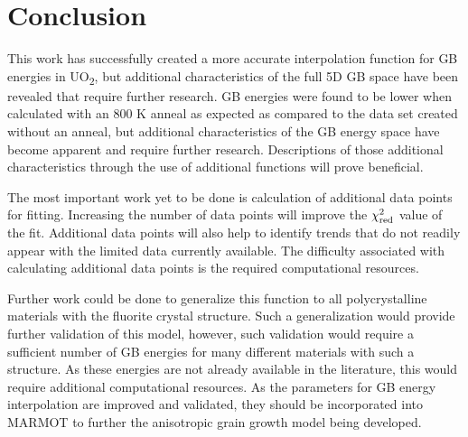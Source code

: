 \documentclass[12pt]{report}
\begin{document}
\chapter{Conclusion}

This work has successfully created a more accurate interpolation function for GB energies in UO\textsubscript{2}, but additional characteristics of the full 5D GB space have been revealed that require further research.  GB energies were found to be lower when calculated with an 800 K anneal as expected as compared to the data set created without an anneal, but additional characteristics of the GB energy space have become apparent and require further research.  Descriptions of those additional characteristics through the use of additional functions will prove beneficial.  

The most important work yet to be done is calculation of additional data points for fitting.  Increasing the number of data points will improve the $\chi_{\textnormal{red}}^2$ value of the fit.  Additional data points will also help to identify trends that do not readily appear with the limited data currently available.  The difficulty associated with calculating additional data points is the required computational resources.  %

Further work could be done to generalize this function to all polycrystalline materials with the fluorite crystal structure.  Such a generalization would provide further validation of this model, however, such validation would require a sufficient number of GB energies for many different materials with such a structure.  As these energies are not already available in the literature, this would require additional computational resources.  As the parameters for GB energy interpolation are improved and validated, they should be incorporated into MARMOT to further the anisotropic grain growth model being developed.
\end{document}
